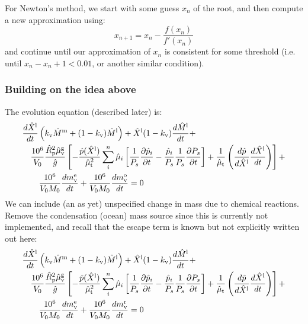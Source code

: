 For Newton's method, we start with some guess $x_n$ of the root, and then compute a new approximation using: 
\begin{equation}
    x_{n+1} = x_n - \frac{f(x_n)}{f'(x_n)}
\end{equation}
and continue until our approximation of $x_n$ is consistent for some threshold (i.e. until $x_n-x_n+1<0.01$, or another similar condition). 
\subsubsection{Building on the idea above}
The evolution equation (described later) is:
\begin{align}
&\frac{d \hat{X}^{\rm l}}{d t} \left(k_{\rm v} \hat{M}^{\rm m} + (1-k_{\rm v}) \hat{M}^{\rm l} \right)
+ \hat{X}^{\rm l} (1-k_{\rm v}) \frac{d \hat{M}^{\rm l}}{d t} + \nonumber \\
&\quad \frac{10^6}{V_0} \frac{\hat{R}_{\rm p}^2 \hat{\mu}_{\rm v}^{\rm g}}{\hat{g}}
\left[
-\frac{\hat{p}(\hat{X}^{\rm l})}{\hat{\mu}_{\rm t}^2} \sum_i^n \hat{\mu}_i \left[ \frac{1}{P_s} \frac{\partial \hat{p}_i}{\partial t} - \frac{\hat{p}_i}{P_s} \frac{1}{P_s} \frac{\partial P_s}{\partial t} \right] + \frac{1}{\hat{\mu}_{\rm t}} \left( \frac{d \hat{p}}{d \hat{X}^{\rm l}} \frac{d \hat{X}^{\rm l}}{d t} \right)
\right]+ \nonumber \\
& \qquad \frac{10^6}{V_0 M_0} \frac{dm_{\rm v}^{\rm e}}{dt} + \frac{10^6}{V_0 M_0} \frac{dm_{\rm v}^{\rm o}}{dt} = 0
\end{align}
We can include (an as yet) unspecified change in mass due to chemical reactions.  Remove the condensation (ocean) mass source since this is currently not implemented, and recall that the escape term is known but not explicitly written out here:
\begin{align}
&\frac{d \hat{X}^{\rm l}}{d t} \left(k_{\rm v} \hat{M}^{\rm m} + (1-k_{\rm v}) \hat{M}^{\rm l} \right)
+ \hat{X}^{\rm l} (1-k_{\rm v}) \frac{d \hat{M}^{\rm l}}{d t} + \nonumber \\
&\quad \frac{10^6}{V_0} \frac{\hat{R}_{\rm p}^2 \hat{\mu}_{\rm v}^{\rm g}}{\hat{g}}
\left[
-\frac{\hat{p}(\hat{X}^{\rm l})}{\hat{\mu}_{\rm t}^2} \sum_i^n \hat{\mu}_i \left[ \frac{1}{P_s} \frac{\partial \hat{p}_i}{\partial t} - \frac{\hat{p}_i}{P_s} \frac{1}{P_s} \frac{\partial P_s}{\partial t} \right] + \frac{1}{\hat{\mu}_{\rm t}} \left( \frac{d \hat{p}}{d \hat{X}^{\rm l}} \frac{d \hat{X}^{\rm l}}{d t} \right)
\right]+ \nonumber \\
& \qquad \frac{10^6}{V_0 M_0} \frac{dm_{\rm v}^{\rm e}}{dt} + \frac{10^6}{V_0 M_0} \frac{dm_{\rm v}^{\rm r}}{dt} = 0
\end{align}
